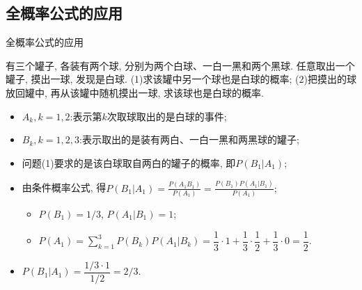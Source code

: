 \subsection{全概率公式的应用}
\begin{frame}{全概率公式的应用}
	\begin{exam}
		有三个罐子, 各装有两个球, 分别为两个白球、一白一黑和两个黑球. 任意取出一个罐子, 摸出一球, 发现是白球. (1)求该罐中另一个球也是白球的概率; (2)把摸出的球放回罐中, 再从该罐中随机摸出一球, 求该球也是白球的概率.
	\end{exam}

	\begin{jieda}
		\begin{itemize}[<+-|alert@+>]
			\item $A_k, k=1,2$:表示第$k$次取球取出的是白球的事件;
			\item $B_k, k=1,2,3$:表示取出的是装有两白、一白一黑和两黑球的罐子;
			\item 问题(1)要求的是该白球取自两白的罐子的概率, 即$P(B_1|A_1)$;
			\item 由条件概率公式, 得$P(B_1|A_1)=\frac{P(A_1B_1)}{P(A_1)}=\frac{P(B_1)P(A_1|B_1)}{P(A_1)};$%
			\begin{itemize}[<+-|alert@+>]
				\item $P(B_1)=1/3$, \pause $P(A_1|B_1)=1$;\pause
				\item $P(A_1)=\sum\limits_{k=1}^{3}P(B_k)P(A_1|B_k)=\dfrac{1}{3}\cdot 1+\dfrac{1}{3}\cdot\dfrac{1}{2}+\dfrac{1}{3}\cdot 0=\dfrac{1}{2}.$
			\end{itemize}
			\item $P(B_1|A_1)=\dfrac{1/3\cdot 1}{1/2}=2/3$.
		\end{itemize}

	\end{jieda}
\end{frame}

